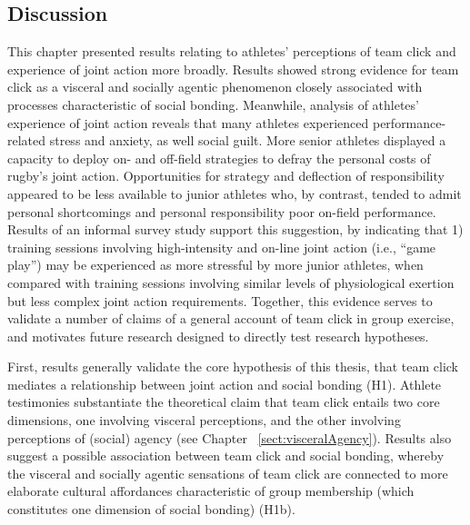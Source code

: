 \begin{CJK}{UTF8}{gbsn}
\section{Discussion}
This chapter presented results relating to athletes' perceptions of team click and experience of joint action more broadly.  Results showed strong evidence for team click as a visceral and socially agentic phenomenon closely associated with processes characteristic of social bonding.  Meanwhile, analysis of athletes' experience of joint action reveals that many athletes experienced performance-related stress and anxiety, as well social guilt.  More senior athletes displayed a capacity to deploy on- and off-field strategies to defray the personal costs of rugby's joint action.  Opportunities for strategy and deflection of responsibility appeared to be less available to junior athletes who, by contrast, tended to admit personal shortcomings and personal responsibility poor on-field performance.  Results of an informal survey study support this suggestion, by indicating that 1) training sessions involving high-intensity and on-line joint action (i.e., ``game play'')  may be experienced as more stressful by more junior athletes, when compared with training sessions involving similar levels of physiological exertion but less complex joint action requirements. Together, this evidence serves to validate a number of claims of a general account of team click in group exercise, and motivates future research designed to directly test research hypotheses.

First, results generally validate the core hypothesis of this thesis, that team click mediates a relationship between joint action and social bonding (H1).  Athlete testimonies substantiate the theoretical claim that team click entails two core dimensions, one involving visceral perceptions, and the other involving perceptions of (social) agency (see Chapter ~\ref{sect:visceralAgency}).  Results also suggest a possible association between team click and social bonding, whereby the visceral and socially agentic sensations of team click are connected to more elaborate cultural affordances characteristic of group membership (which constitutes one dimension of social bonding) (H1b).


\end{CJK}
